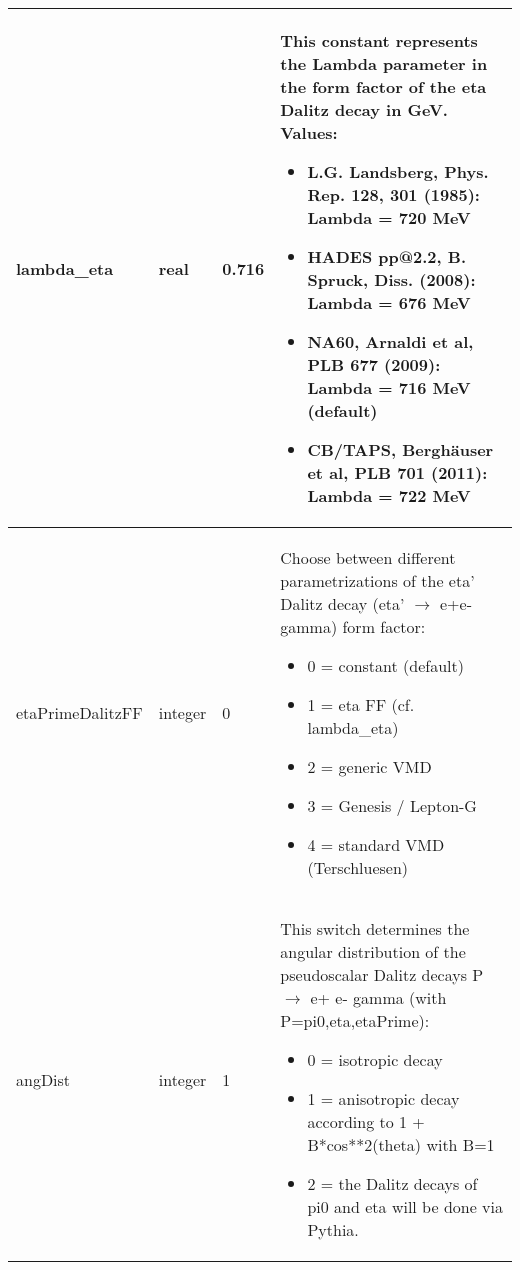 \documentclass{article}
\begin{document}
\begin{longtable}{llll}
\midrule
lambda\_eta & \begin{minipage}[t]{2cm}real\end{minipage} & \begin{minipage}[t]{2cm}0.716\end{minipage} & \begin{minipage}[t]{12cm}This constant represents the Lambda parameter in the form factor of the eta Dalitz decay in GeV. Values:\begin{itemize}\leftmargin0em\itemindent0pt\item L.G. Landsberg, Phys. Rep. 128, 301 (1985): Lambda = 720 MeV\item HADES pp@2.2, B. Spruck, Diss. (2008):      Lambda = 676 MeV\item NA60, Arnaldi et al, PLB 677 (2009):        Lambda = 716 MeV (default)\item CB/TAPS, Berghäuser et al, PLB 701 (2011):  Lambda = 722 MeV\end{itemize}\end{minipage}\\*
\midrule
etaPrimeDalitzFF & \begin{minipage}[t]{2cm}integer\end{minipage} & \begin{minipage}[t]{2cm}0\end{minipage} & \begin{minipage}[t]{12cm}Choose between different parametrizations of the eta' Dalitz decay (eta' $\rightarrow$ e+e- gamma) form factor:\begin{itemize}\leftmargin0em\itemindent0pt\item 0 = constant (default)\item 1 = eta FF (cf. lambda\_eta)\item 2 = generic VMD\item 3 = Genesis / Lepton-G\item 4 = standard VMD (Terschluesen)\end{itemize}\end{minipage}\\*
\midrule
angDist & \begin{minipage}[t]{2cm}integer\end{minipage} & \begin{minipage}[t]{2cm}1\end{minipage} & \begin{minipage}[t]{12cm}This switch determines the angular distribution of the pseudoscalar Dalitz decays P $\rightarrow$ e+ e- gamma (with P=pi0,eta,etaPrime):\begin{itemize}\leftmargin0em\itemindent0pt\item 0 = isotropic decay\item 1 = anisotropic decay according to 1 + B*cos**2(theta) with B=1\item 2 = the Dalitz decays of pi0 and eta will be done via Pythia.\end{itemize}\end{minipage}\\*

\end{longtable}
\end{document}
